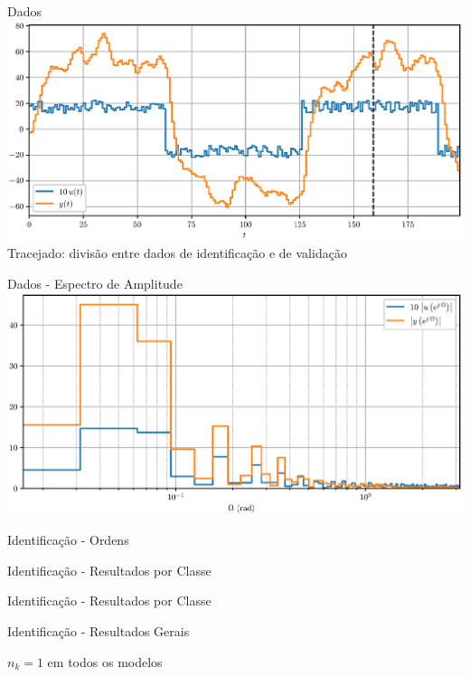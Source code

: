 \documentclass{beamer}
\begin{document}
\begin{frame}{Dados}
  \includegraphics[width=\linewidth]{data_folded}
  Tracejado: divisão entre dados de identificação e de validação
\end{frame}

\begin{frame}{Dados - Espectro de Amplitude}
  \includegraphics[width=\linewidth]{data_fourier_log}
\end{frame}

\begin{frame}{Identificação - Ordens}
  
\end{frame}

\begin{frame}{Identificação - Resultados por Classe}
  
\end{frame}

\begin{frame}{Identificação - Resultados por Classe}
  
\end{frame}

\begin{frame}{Identificação - Resultados Gerais}
  
  $n_k = 1$ em todos os modelos
\end{frame}
\end{document}
